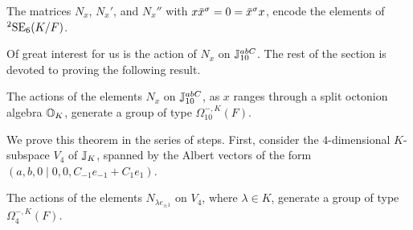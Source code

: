 \begin{proposition}
	The matrices $N_x$, $N_x'$, and $N_x''$ with $x\ovx^{\s} = 0 = \ovx^{\s}x$, encode
	the elements of ${}^2\mathrm{SE}_6(K/F)$. 
\end{proposition}

Of great interest for us is the action of $N_x$ on $\mathbb{J}_{10}^{abC}$. The rest of the section
is devoted to proving the following result.

\begin{theorem}
	\label{theorem:3_nx_omega}
	The actions of the elements $N_x$ on $\mathbb{J}_{10}^{abC}$, as $x$ ranges through a split
	octonion algebra $\mathbb{O}_K$, generate a group of type $\Omega_{10}^{-,K}(F)$. 
\end{theorem}

We prove this theorem in the series of steps. First, consider the $4$-dimensional 
$K$-subspace $V_4$ of $\mathbb{J}_K$, 
spanned by the Albert vectors of the form $(a,b,0\mid 0,0,C_{-1} e_{-1} + C_1 e_1)$. 

\begin{lemma}
	The actions of the elements $N_{\lambda e_{ \pm 1 }}$ on $V_4$, where $\lambda \in K$, 
	generate a group of type $\Omega_4^{-,K}(F)$. 
\end{lemma}

